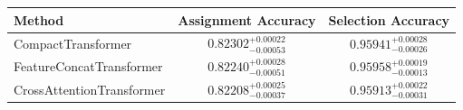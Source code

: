     \begin{tabular}{lcc}
        \toprule
        Method & Assignment Accuracy & Selection Accuracy \\
        \midrule
        CompactTransformer & $0.82302_{-0.00053}^{+0.00022}$ & $0.95941_{-0.00026}^{+0.00028}$ \\
        FeatureConcatTransformer & $0.82240_{-0.00051}^{+0.00028}$ & $0.95958_{-0.00013}^{+0.00019}$ \\
        CrossAttentionTransformer & $0.82208_{-0.00037}^{+0.00025}$ & $0.95913_{-0.00031}^{+0.00022}$ \\
        \bottomrule
    \end{tabular}